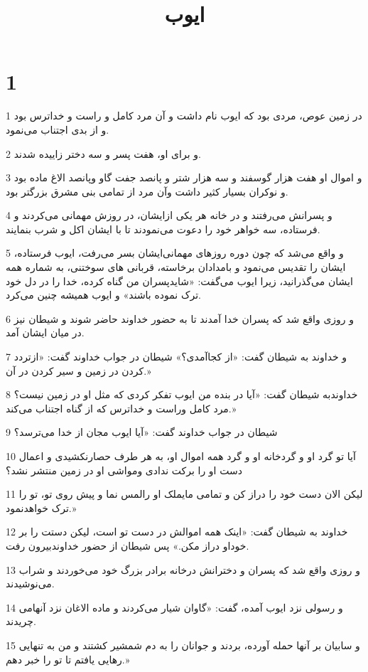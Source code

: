 

\title{ايوب}

 
\chapter{1}

\par 1 در زمین عوص، مردی بود که ایوب نام داشت و آن مرد کامل و راست و خداترس بود و از بدی اجتناب می‌نمود.
\par 2 و برای او، هفت پسر و سه دختر زاییده شدند.
\par 3 و اموال او هفت هزار گوسفند و سه هزار شتر و پانصد جفت گاو وپانصد الاغ ماده بود و نوکران بسیار کثیر داشت وآن مرد از تمامی بنی مشرق بزرگتر بود.
\par 4 و پسرانش می‌رفتند و در خانه هر یکی ازایشان، در روزش مهمانی می‌کردند و فرستاده، سه خواهر خود را دعوت می‌نمودند تا با ایشان اکل و شرب بنمایند.
\par 5 و واقع می‌شد که چون دوره روزهای مهمانی‌ایشان بسر می‌رفت، ایوب فرستاده، ایشان را تقدیس می‌نمود و بامدادان برخاسته، قربانی های سوختنی، به شماره همه ایشان می‌گذرانید، زیرا ایوب می‌گفت: «شایدپسران من گناه کرده، خدا را در دل خود ترک نموده باشند» و ایوب همیشه چنین می‌کرد.
\par 6 و روزی واقع شد که پسران خدا آمدند تا به حضور خداوند حاضر شوند و شیطان نیز در میان ایشان آمد.
\par 7 و خداوند به شیطان گفت: «از کجاآمدی؟» شیطان در جواب خداوند گفت: «ازتردد کردن در زمین و سیر کردن در آن.»
\par 8 خداوندبه شیطان گفت: «آیا در بنده من ایوب تفکر کردی که مثل او در زمین نیست؟ مرد کامل وراست و خداترس که از گناه اجتناب می‌کند.»
\par 9 شیطان در جواب خداوند گفت: «آیا ایوب مجان از خدا می‌ترسد؟
\par 10 آیا تو گرد او و گردخانه او و گرد همه اموال او، به هر طرف حصارنکشیدی و اعمال دست او را برکت ندادی ومواشی او در زمین منتشر نشد؟
\par 11 لیکن الان دست خود را دراز کن و تمامی مایملک او رالمس نما و پیش روی تو، تو را ترک خواهدنمود.»
\par 12 خداوند به شیطان گفت: «اینک همه اموالش در دست تو است، لیکن دستت را بر خوداو دراز مکن.» پس شیطان از حضور خداوندبیرون رفت.
\par 13 و روزی واقع شد که پسران و دخترانش درخانه برادر بزرگ خود می‌خوردند و شراب می‌نوشیدند.
\par 14 و رسولی نزد ایوب آمده، گفت: «گاوان شیار می‌کردند و ماده الاغان نزد آنهامی چریدند.
\par 15 و سابیان بر آنها حمله آورده، بردند و جوانان را به دم شمشیر کشتند و من به تنهایی رهایی یافتم تا تو را خبر دهم.»

